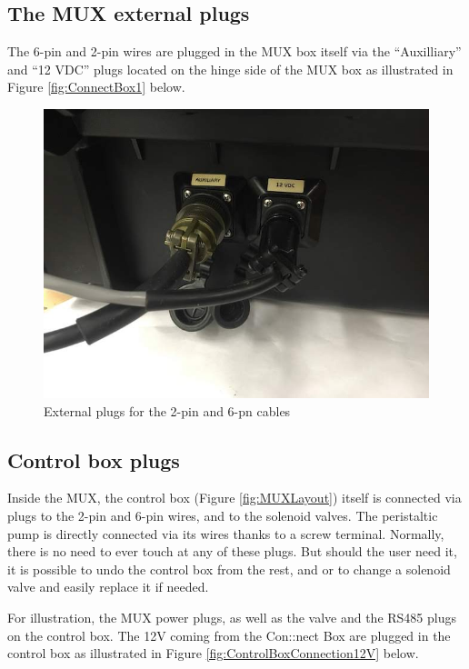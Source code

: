 \documentclass[]{book}
\begin{document}
\hypertarget{the-mux-external-plugs}{%
\subsection{The MUX external plugs}\label{the-mux-external-plugs}}

The 6-pin and 2-pin wires are plugged in the MUX box itself via the ``Auxilliary'' and ``12 VDC'' plugs located on the hinge side of the MUX box as illustrated in Figure \ref{fig:ConnectBox1} below.

\begin{figure}

{\centering \includegraphics[width=0.8\linewidth]{pictures/ExternalPlugs} 

}

\caption{External plugs for the 2-pin and 6-pn cables}\label{fig:ExternalPlugs}
\end{figure}

\hypertarget{control-box-plugs}{%
\subsection{Control box plugs}\label{control-box-plugs}}

Inside the MUX, the control box (Figure \ref{fig:MUXLayout}) itself is connected via plugs to the 2-pin and 6-pin wires, and to the solenoid valves. The peristaltic pump is directly connected via its wires thanks to a screw terminal. Normally, there is no need to ever touch at any of these plugs. But should the user need it, it is possible to undo the control box from the rest, and or to change a solenoid valve and easily replace it if needed.

For illustration, the MUX power plugs, as well as the valve and the RS485 plugs on the control box. The 12V coming from the Con::nect Box are plugged in the control box as illustrated in Figure \ref{fig:ControlBoxConnection12V} below.
\end{document}

